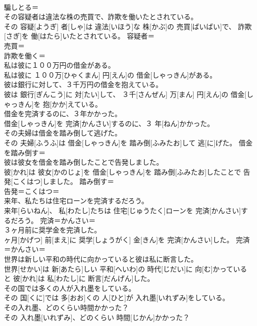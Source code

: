 \documentclass[8pt]{extreport}
\begin{document}
\begin{CJK}{UTF8}{min}
\\	騙しとる＝ 
\\	その容疑者は違法な株の売買で、詐欺を働いたとされている。	
\\	その 容疑[ようぎ] 者[しゃ]は 違法[いほう]な 株[かぶ]の 売買[ばいばい]で、 詐欺[さぎ]を 働[はたら]いたとされている。	容疑者＝ 
\\	売買＝ 
\\	詐欺を働く＝ 
\\	私は彼に１００万円の借金がある。	
\\	私は彼に １００万[ひゃくまん] 円[えん]の 借金[しゃっきん]がある。	
\\	彼は銀行に対して、３千万円の借金を抱えている。	
\\	彼は 銀行[ぎんこう]に 対[たい]して、 ３千[さんぜん] 万[まん] 円[えん]の 借金[しゃっきん]を 抱[かか]えている。	
\\	借金を完済するのに、３年かかった。	
\\	借金[しゃっきん]を 完済[かんさい]するのに、３ 年[ねん]かかった。	
\\	その夫婦は借金を踏み倒して逃げた。	
\\	その 夫婦[ふうふ]は 借金[しゃっきん]を 踏み倒[ふみたお]して 逃[に]げた。	借金を踏み倒す＝ 
\\	彼は彼女を借金を踏み倒したことで告発しました。	
\\	彼[かれ]は 彼女[かのじょ]を 借金[しゃっきん]を 踏み倒[ふみたお]したことで 告発[こくはつ]しました。	踏み倒す＝ 
\\	告発＝こくはつ＝ 
\\	来年、私たちは住宅ローンを完済するだろう。	
\\	来年[らいねん]、 私[わたし]たちは 住宅[じゅうたく]ローンを 完済[かんさい]するだろう。	完済＝かんさい＝ 
\\	３ヶ月前に奨学金を完済した。	
\\	ヶ月[かげつ] 前[まえ]に 奨学[しょうがく] 金[きん]を 完済[かんさい]した。	完済＝かんさい＝ 
\\	世界は新しい平和の時代に向かっていると彼は私に断言した。	
\\	世界[せかい]は 新[あたら]しい 平和[へいわ]の 時代[じだい]に 向[む]かっていると 彼[かれ]は 私[わたし]に 断言[だんげん]した。	
\\	その国では多くの人が入れ墨をしている。	
\\	その 国[くに]では 多[おお]くの 人[ひと]が 入れ墨[いれずみ]をしている。	
\\	その入れ墨、どのくらい時間かかった？	
\\	その 入れ墨[いれずみ]、どのくらい 時間[じかん]かかった？	

\end{CJK}
\end{document}

